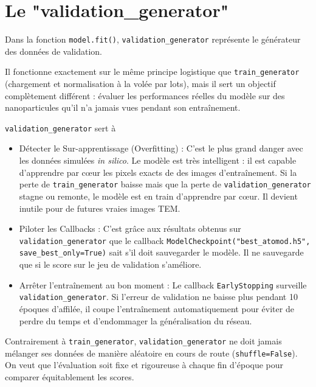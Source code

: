 \documentclass[12pt,a4paper,french]{book}
\newenvironment{warningbox}
{\begin{tcolorbox}[colback=lightyellow, colframe=darkred, title=\textbf{⚠ Attention}, boxrule=1.5pt]}
{\end{tcolorbox}}
\begin{document}
\cprotect\section{Le "validation\_generator"}
Dans la fonction \verb+model.fit()+, \verb+validation_generator+ représente le générateur des données de validation.

Il fonctionne exactement sur le même principe logistique que \verb+train_generator+ (chargement et normalisation à la volée par lots), mais il sert un objectif complètement différent : évaluer les performances réelles du modèle sur des nanoparticules qu'il n'a jamais vues pendant son entraînement.

\verb+validation_generator+ sert à
\begin{itemize}
	\item Détecter le Sur-apprentissage (Overfitting) : C'est le plus grand danger avec les données simulées \textit{in silico}. Le modèle est très intelligent : il est capable d'apprendre par cœur les pixels exacts de des images d'entraînement. Si la perte de \verb+train_generator+ baisse mais que la perte de \verb+validation_generator+ stagne ou remonte, le modèle est en train d'apprendre par cœur. Il devient inutile pour de futures vraies images TEM.
	\item Piloter les Callbacks : C'est grâce aux résultats obtenus sur \verb+validation_generator+ que le callback \verb+ModelCheckpoint("best_atomod.h5", save_best_only=True)+ sait s'il doit sauvegarder le modèle. Il ne sauvegarde que si le score sur le jeu de validation s'améliore.
	\item Arrêter l'entraînement au bon moment : Le callback \verb+EarlyStopping+ surveille \verb+validation_generator+. Si l'erreur de validation ne baisse plus pendant 10 époques d'affilée, il coupe l'entraînement automatiquement pour éviter de perdre du temps et d'endommager la généralisation du réseau.
\end{itemize}

\begin{warningbox}
Contrairement à \verb+train_generator+, \verb+validation_generator+ ne doit jamais mélanger ses données de manière aléatoire en cours de route (\verb+shuffle=False+). On veut que l'évaluation soit fixe et rigoureuse à chaque fin d'époque pour comparer équitablement les scores.
\end{warningbox}

\end{document}
